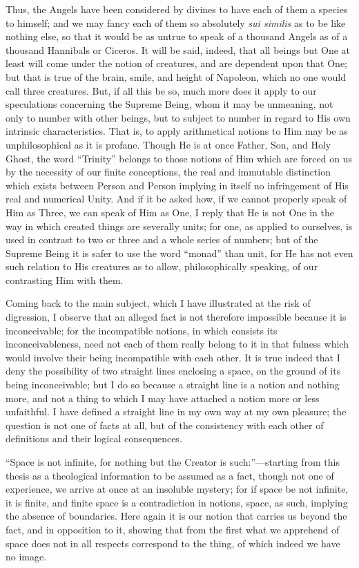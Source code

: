 Thus, the Angels have been considered by divines to have each of
them a species to himself; and we may fancy each of them so absolutely
\emph{sui similis} as to be like nothing else, so that it would be as
untrue to speak of a thousand Angels as of a thousand Hannibals or
Ciceros. It will be said, indeed, that all beings but One at least
will come under the notion of creatures, and are dependent upon that
One; but that is true of the brain, smile, and height of Napoleon,
which no one would call three creatures. But, if all this be so, much
more does it apply to our speculations concerning the Supreme Being,
whom it may be unmeaning, not only to number with other beings, but to
subject to number in regard to His own intrinsic characteristics. That
is, to apply arithmetical notions to Him may be as unphilosophical as
it is profane. Though He is at once Father, Son, and Holy Ghost, the
word ``Trinity'' belongs to those notions of Him which are
forced on us by the necessity of our finite conceptions, the real and
immutable distinction which exists between Person and Person implying
in itself no infringement of His real and numerical Unity. And if it
be asked how, if we cannot properly speak of Him as Three, we can
speak of Him as One, I reply that He is not One in the way in which
created things are severally units; for one, as applied to ourselves,
is used in contrast to two or three and a whole series of numbers; but
of the Supreme Being it is safer to use the word ``monad''
than unit, for He has not even such relation to His creatures as to
allow, philosophically speaking, of our contrasting Him with them.

Coming back to the main subject, which I have illustrated at the
risk of digression, I observe that an alleged fact is not therefore
impossible because it is inconceivable; for the incompatible notions,
in which consists its inconceivableness, need not each of them really
belong to it in that fulness which would involve their being
incompatible with each other. It is true indeed that I deny the
possibility of two straight lines enclosing a space, on the ground of
its being inconceivable; but I do so because a straight line is a
notion and nothing more, and not a thing to which I may have attached
a notion more or less unfaithful. I have defined a straight line in my
own way at my own pleasure; the question is not one of facts at all,
but of the consistency with each other of definitions and their
logical consequences.

``Space is not infinite, for nothing but the Creator is
such:''—starting from this thesis as a theological information
to be assumed as a fact, though not one of experience, we arrive at
once at an insoluble mystery; for if space be not infinite, it is
finite, and finite space is a contradiction in notions, space, as
such, implying the absence of boundaries. Here again it is our
notion that carries us beyond the fact, and in opposition to it,
showing that from the first what we apprehend of space does not in all
respects correspond to the thing, of which indeed we have no image.

